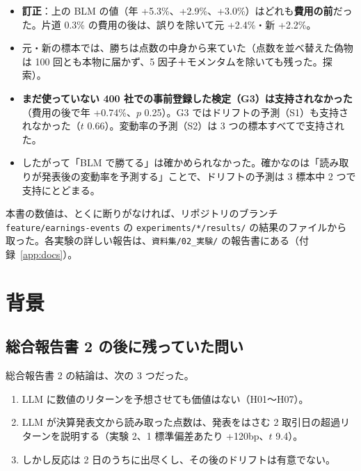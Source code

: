 \documentclass[xelatex,ja=standard,jafont=haranoaji,a4paper,10pt]{bxjsreport}
\newcommand{\code}[1]{\texttt{#1}}
\begin{document}
\begin{notebox}
\begin{itemize}
\item \textbf{訂正}：上の BLM の値（年 +5.3\%、+2.9\%、+3.0\%）はどれも\textbf{費用の前}だった。片道 0.3\% の費用の後は、誤りを除いて元 +2.4\%・新 +2.2\%。
\item 元・新の標本では、勝ちは点数の中身から来ていた（点数を並べ替えた偽物は 100 回とも本物に届かず、5 因子＋モメンタムを除いても残った。探索）。
\item \textbf{まだ使っていない 400 社での事前登録した検定（G3）は支持されなかった}（費用の後で年 +0.74\%、$p$ 0.25）。G3 ではドリフトの予測（S1）も支持されなかった（$t$ 0.66）。変動率の予測（S2）は 3 つの標本すべてで支持された。
\item したがって「BLM で勝てる」は確かめられなかった。確かなのは「読み取りが発表後の変動率を予測する」ことで、ドリフトの予測は 3 標本中 2 つで支持にとどまる。
\end{itemize}
\end{notebox}

本書の数値は、とくに断りがなければ、リポジトリのブランチ \code{feature/earnings-events} の \code{experiments/*/results/} の結果のファイルから取った。各実験の詳しい報告は、\code{資料集/02\_実験/} の報告書にある（付録~\ref{app:docs}）。

\setcounter{tocdepth}{1}
\tableofcontents

\part{背景}

\chapter{総合報告書 2 の後に残っていた問い}\label{ch:intro}

総合報告書 2 の結論は、次の 3 つだった。

\begin{enumerate}
\item LLM に数値のリターンを予想させても価値はない（H01〜H07）。
\item LLM が決算発表文から読み取った点数は、発表をはさむ 2 取引日の超過リターンを説明する（実験 2、1 標準偏差あたり +120bp、$t$ 9.4）。
\item しかし反応は 2 日のうちに出尽くし、その後のドリフトは有意でない。
\end{enumerate}
\end{document}
